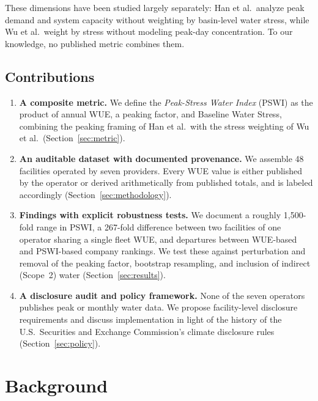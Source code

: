 \documentclass[conference,10pt]{IEEEtran}
\begin{document}
These dimensions have been studied largely separately: Han et al.\ analyze
peak demand and system capacity without weighting by basin-level water
stress, while Wu et al.\ weight by stress without modeling peak-day
concentration. To our knowledge, no published metric combines them.

\subsection{Contributions}

\begin{enumerate}
    \item \textbf{A composite metric.} We define the \emph{Peak-Stress Water
        Index} (PSWI) as the product of annual WUE, a peaking factor, and
        Baseline Water Stress, combining the peaking framing of Han et al.\
        with the stress weighting of Wu et al.\ (Section~\ref{sec:metric}).
    \item \textbf{An auditable dataset with documented provenance.} We
        assemble 48 facilities operated by seven providers. Every WUE value
        is either published by the operator or derived arithmetically from
        published totals, and is labeled accordingly
        (Section~\ref{sec:methodology}).
    \item \textbf{Findings with explicit robustness tests.} We document a
        roughly 1{,}500-fold range in PSWI, a 267-fold difference between two
        facilities of one operator sharing a single fleet WUE, and
        departures between WUE-based and PSWI-based company rankings. We
        test these against perturbation and removal of the peaking factor,
        bootstrap resampling, and inclusion of indirect (Scope~2) water
        (Section~\ref{sec:results}).
    \item \textbf{A disclosure audit and policy framework.} None of the
        seven operators publishes peak or monthly water data. We propose
        facility-level disclosure requirements and discuss implementation in
        light of the history of the U.S.\ Securities and Exchange
        Commission's climate disclosure rules (Section~\ref{sec:policy}).
\end{enumerate}

\section{Background}
\label{sec:background}
\end{document}
